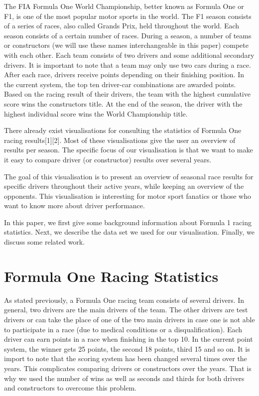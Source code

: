 \documentclass{sigchi}
\begin{document}
The FIA Formula One World Championship, better known as Formula One or F1, is one of the most popular motor sports in the world. The F1 season consists of a series of races, also called Grands Prix, held throughout the world. Each season consists of a certain number of races. During a season, a number of teams or constructors (we will use these names interchangeable in this paper) compete with each other. Each team consists of two drivers and some additional secondary drivers. It is important to note that a team may only use two cars during a race. After each race, drivers receive points depending on their finishing position. In the current system, the top ten driver-car combinations are awarded points. Based on the racing result of their drivers, the team with the highest cumulative score wins the constructors title. At the end of the season, the driver with the highest individual score wins the World Championship title.

There already exist visualisations for consulting the statistics of Formula One racing results[1][2]. Most of these visualisations give the user an overview of results per season. The specific focus of our visualisation is that we want to make it easy to compare driver (or constructor) results over several years.

The goal of this visualisation is to present an overview of seasonal race results for specific drivers throughout their active years, while keeping an overview of the opponents. This visualisation is interesting for motor sport fanatics or those who want to know more about driver performance.

In this paper, we first give some background information about Formula 1 racing statistics. Next, we describe the data set we used for our visualisation. Finally, we discuss some related work. 


\section{Formula One Racing Statistics}

As stated previously, a Formula One racing team consists of several drivers. In general, two drivers are the main drivers of the team. The other drivers are test drivers or can take the place of one of the two main drivers in case one is not able to participate in a race (due to medical conditions or a disqualification). Each driver can earn points in a race when finishing in the top 10. In the current point system, the winner gets 25 points, the second 18 points, third 15 and so on. It is import to note that the scoring system has been changed several times over the years. This complicates comparing drivers or constructors over the years. That is why we used the number of wins as well as seconds and thirds for both drivers and constructors to overcome this problem.
\end{document}
